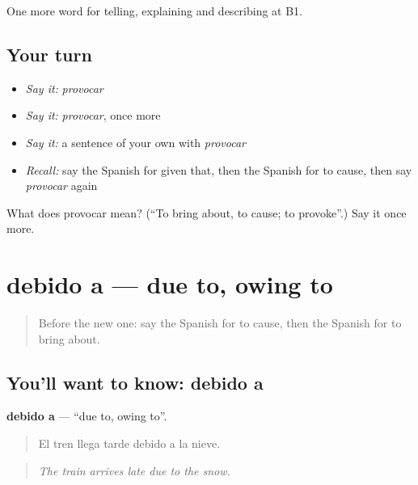 \begin{grammarlens}[title={What you've built}]
One more word for telling, explaining and describing at B1.
\end{grammarlens}

\subsection*{Your turn}
\begin{itemize}
\raggedright
  \item \emph{Say it:} \emph{provocar}
  \item \emph{Say it:} \emph{provocar}, once more
  \item \emph{Say it:} a sentence of your own with \emph{provocar}
  \item \emph{Recall:} say the Spanish for given that, then the Spanish for to cause, then say \emph{provocar} again
\end{itemize}

\begin{tcolorbox}[breakable,colback=teal!4,colframe=teal!35!black,title={Before you move on}]
What does provocar mean? (\textquotedblleft{}To bring about, to cause; to provoke\textquotedblright{}.) Say it once more.
\end{tcolorbox}
\section[debido a]{debido a — due to, owing to}

\label{lesson:ES-C581-debido-a}



\begin{quote}
Before the new one: say the Spanish for to cause, then the Spanish for to bring about.
\end{quote}

\subsection*{You'll want to know: debido a}
\textbf{debido a} — \textquotedblleft{}due to, owing to\textquotedblright{}.

\begin{quote}
El tren llega tarde debido a la nieve.
\end{quote}

\begin{quote}
\emph{The train arrives late due to the snow.}
\end{quote}

